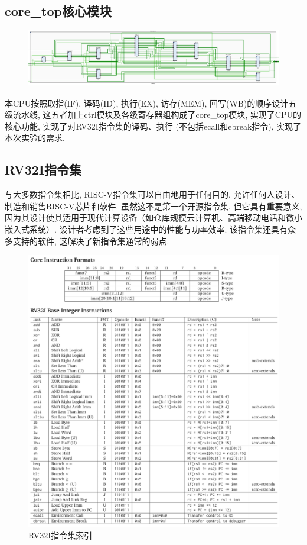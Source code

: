 \documentclass[lang=cn,11pt,a4paper,chinesefont=founder]{elegantpaper}
\begin{document}
\subsection{core\_top核心模块}
\begin{figure}[h]
    \centering
    \includegraphics[scale=0.5]{coretop}
\end{figure}
本CPU按照取指(IF), 译码(ID), 执行(EX), 访存(MEM), 回写(WB)的顺序设计五级流水线, 这五者加上ctrl模块及各级寄存器组构成了core\_top模块, 实现了CPU的核心功能, 实现了对RV32I指令集的译码、执行
(不包括ecall和ebreak指令), 实现了本次实验的需求. 
\subsection{RV32I指令集}
与大多数指令集相比, RISC-V指令集可以自由地用于任何目的, 允许任何人设计、制造和销售RISC-V芯片和软件. 虽然这不是第一个开源指令集, 但它具有重要意义, 
因为其设计使其适用于现代计算设备（如仓库规模云计算机、高端移动电话和微小嵌入式系统）. 设计者考虑到了这些用途中的性能与功率效率. 
该指令集还具有众多支持的软件, 这解决了新指令集通常的弱点. 

%   
\begin{figure}
    \centering
    \includegraphics[width=\linewidth]{ISA.png}
    \caption{RV32I指令集索引}
    \label{fig:}
\end{figure}
\end{document}
